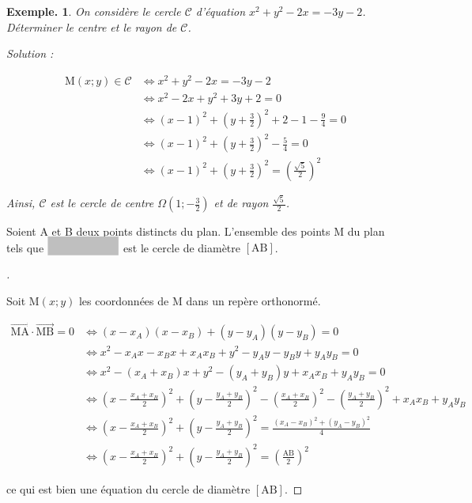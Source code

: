 \documentclass[12pt]{article}
\theoremstyle{break}
\newtheorem*{example}{Exemple.}
\newenvironment{demo}[1][\proofname]{%
  \begin{proof}[#1]$ $\newline
  }{%
  \end{proof}
}
\begin{document}
\begin{example}
  On considère le cercle $\mathcal{C}$ d'équation $x^{2}+y^{2}-2 x=-3 y-2$.\\
  Déterminer le centre et le rayon de $\mathcal{C}$.

  \newpage
  Solution :

  $$
  \begin{aligned}
    \mathrm{M}(x ; y) \in \mathcal{C} & \Longleftrightarrow x^{2}+y^{2}-2 x=-3 y-2 \\
    & \Longleftrightarrow x^{2}-2 x+y^{2}+3 y+2=0 \\
    & \Longleftrightarrow(x-1)^{2}+\left(y+\frac{3}{2}\right)^{2}+2-1-\frac{9}{4}=0 \\
    & \Longleftrightarrow(x-1)^{2}+\left(y+\frac{3}{2}\right)^{2}-\frac{5}{4}=0 \\
    & \Longleftrightarrow(x-1)^{2}+\left(y+\frac{3}{2}\right)^{2}=\left(\frac{\sqrt{5}}{2}\right)^{2}
  \end{aligned}
  $$

  Ainsi, $\mathcal{C}$ est le cercle de centre $\Omega\left(1 ;-\frac{3}{2}\right)$ et de rayon $\frac{\sqrt{5}}{2}$.
\end{example}

\begin{proposition}{}{}
  Soient A et B deux points distincts du plan. L'ensemble des points M du plan tels que $\hideM{\overrightarrow{\mathrm{MA}} \cdot \overrightarrow{\mathrm{MB}}=0}$ est le cercle de diamètre $[\mathrm{AB}]$.
\end{proposition}

\begin{demo}
  Soit $\mathrm{M}(x ; y)$ les coordonnées de M dans un repère orthonormé.

  $$
  \begin{aligned}
    \overrightarrow{\mathrm{MA}} \cdot \overrightarrow{\mathrm{MB}}=0 & \Longleftrightarrow\left(x-x_{A}\right)\left(x-x_{B}\right)+\left(y-y_{A}\right)\left(y-y_{B}\right)=0 \\
    & \Longleftrightarrow x^{2}-x_{A} x-x_{B} x+x_{A} x_{B}+y^{2}-y_{A} y-y_{B} y+y_{A} y_{B}=0 \\
    & \Longleftrightarrow x^{2}-\left(x_{A}+x_{B}\right) x+y^{2}-\left(y_{A}+y_{B}\right) y+x_{A} x_{B}+y_{A} y_{B}=0 \\
    & \Longleftrightarrow\left(x-\frac{x_{A}+x_{B}}{2}\right)^{2}+\left(y-\frac{y_{A}+y_{B}}{2}\right)^{2}-\left(\frac{x_{A}+x_{B}}{2}\right)^{2}-\left(\frac{y_{A}+y_{B}}{2}\right)^{2}+x_{A} x_{B}+y_{A} y_{B} \\
    & \Longleftrightarrow\left(x-\frac{x_{A}+x_{B}}{2}\right)^{2}+\left(y-\frac{y_{A}+y_{B}}{2}\right)^{2}=\frac{\left(x_{A}-x_{B}\right)^{2}+\left(y_{A}-y_{B}\right)^{2}}{4} \\
    & \Longleftrightarrow\left(x-\frac{x_{A}+x_{B}}{2}\right)^{2}+\left(y-\frac{y_{A}+y_{B}}{2}\right)^{2}=\left(\frac{\mathrm{AB}}{2}\right)^{2}
  \end{aligned}
  $$

  ce qui est bien une équation du cercle de diamètre $[\mathrm{AB}]$.
\end{demo}
\end{document}
